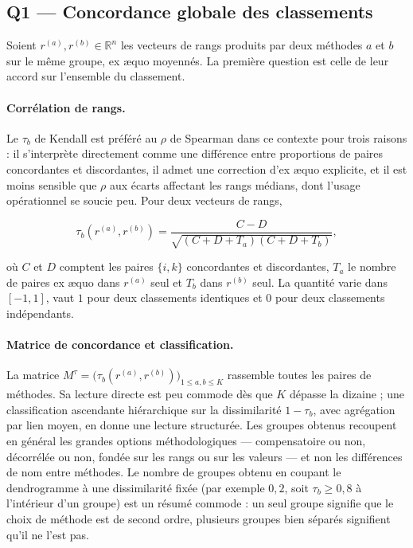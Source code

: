 \documentclass[11pt,a4paper]{article}
\theoremstyle{definition}
\theoremstyle{remark}
\newcommand{\R}{\mathbb{R}}
\begin{document}
\bigskip

\subsection{Q1 --- Concordance globale des classements}
\label{sec:q1}

\medskip

Soient $r^{(a)}, r^{(b)} \in \R^n$ les vecteurs de rangs produits par deux méthodes $a$ et
$b$ sur le même groupe, ex \ae quo moyennés. La première question est celle de leur accord
sur l'ensemble du classement.

\bigskip

\paragraph{Corrélation de rangs.} Le $\tau_b$ de Kendall \citep{kendall1948} est préféré
au $\rho$ de Spearman dans ce contexte pour trois raisons : il s'interprète directement
comme une différence entre proportions de paires concordantes et discordantes, il admet une
correction d'ex \ae quo explicite, et il est moins sensible que $\rho$ aux écarts affectant
les rangs médians, dont l'usage opérationnel se soucie peu. Pour deux vecteurs de rangs,

\medskip

\[
  \tau_b(r^{(a)}, r^{(b)})
  = \frac{C - D}{\sqrt{(C + D + T_a)(C + D + T_b)}},
\]

\bigskip

où $C$ et $D$ comptent les paires $\{i,k\}$ concordantes et discordantes, $T_a$ le nombre
de paires ex \ae quo dans $r^{(a)}$ seul et $T_b$ dans $r^{(b)}$ seul. La quantité varie
dans $[-1,1]$, vaut $1$ pour deux classements identiques et $0$ pour deux classements
indépendants.

\bigskip

\paragraph{Matrice de concordance et classification.} La matrice
$M^\tau = \big(\tau_b(r^{(a)}, r^{(b)})\big)_{1 \le a,b \le K}$ rassemble toutes les paires
de méthodes. Sa lecture directe est peu commode dès que $K$ dépasse la dizaine ; une
classification ascendante hiérarchique sur la dissimilarité $1 - \tau_b$, avec agrégation
par lien moyen, en donne une lecture structurée. Les groupes obtenus recoupent en général
les grandes options méthodologiques --- compensatoire ou non, décorrélée ou non, fondée sur
les rangs ou sur les valeurs --- et non les différences de nom entre méthodes. Le nombre de
groupes obtenu en coupant le dendrogramme à une dissimilarité fixée (par exemple $0{,}2$,
soit $\tau_b \ge 0{,}8$ à l'intérieur d'un groupe) est un résumé commode : un seul groupe
signifie que le choix de méthode est de second ordre, plusieurs groupes bien séparés
signifient qu'il ne l'est pas.
\end{document}
